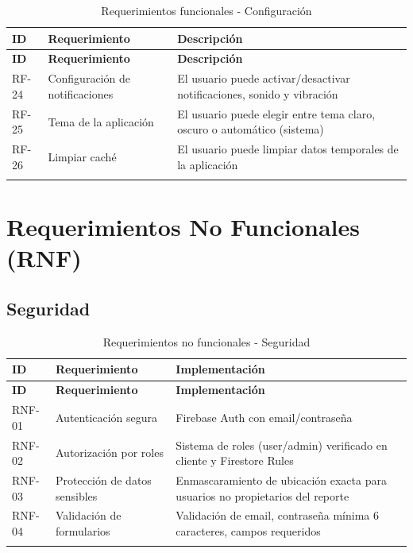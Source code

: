 \documentclass[12pt,a4paper]{article}
\begin{document}
\begin{longtable}{|p{1.5cm}|p{4cm}|p{8cm}|}
\hline
\textbf{ID} & \textbf{Requerimiento} & \textbf{Descripción} \\
\hline
\endfirsthead
\hline
\textbf{ID} & \textbf{Requerimiento} & \textbf{Descripción} \\
\hline
\endhead
RF-24 & Configuración de notificaciones & El usuario puede activar/desactivar notificaciones, sonido y vibración \\
\hline
RF-25 & Tema de la aplicación & El usuario puede elegir entre tema claro, oscuro o automático (sistema) \\
\hline
RF-26 & Limpiar caché & El usuario puede limpiar datos temporales de la aplicación \\
\hline
\caption{Requerimientos funcionales - Configuración}
\end{longtable}


\section{Requerimientos No Funcionales (RNF)}

\subsection{Seguridad}

\begin{longtable}{|p{1.5cm}|p{4cm}|p{8cm}|}
\hline
\textbf{ID} & \textbf{Requerimiento} & \textbf{Implementación} \\
\hline
\endfirsthead
\hline
\textbf{ID} & \textbf{Requerimiento} & \textbf{Implementación} \\
\hline
\endhead
RNF-01 & Autenticación segura & Firebase Auth con email/contraseña \\
\hline
RNF-02 & Autorización por roles & Sistema de roles (user/admin) verificado en cliente y Firestore Rules \\
\hline
RNF-03 & Protección de datos sensibles & Enmascaramiento de ubicación exacta para usuarios no propietarios del reporte \\
\hline
RNF-04 & Validación de formularios & Validación de email, contraseña mínima 6 caracteres, campos requeridos \\
\hline
\caption{Requerimientos no funcionales - Seguridad}
\end{longtable}
\end{document}
